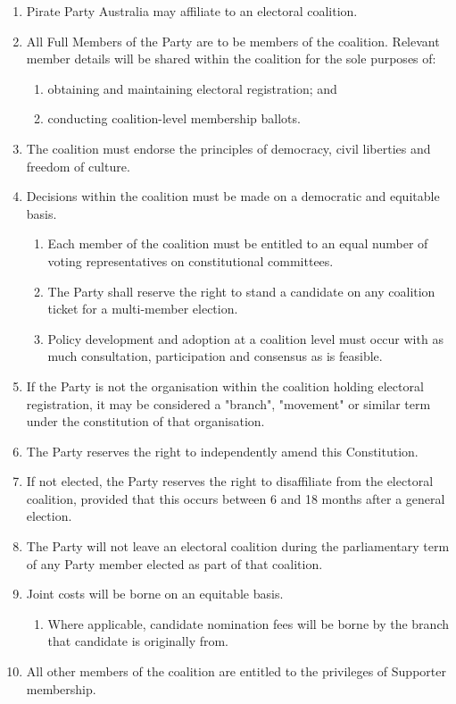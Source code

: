 \documentclass[a4paper,titlepage,8.5pt]{article}
\begin{document}
\begin{enumerate}
\item Pirate Party Australia may affiliate to an electoral coalition.
\item All Full Members of the Party are to be members of the coalition. Relevant member details will be shared within the coalition for the sole purposes of:
\begin{enumerate}
\item obtaining and maintaining electoral registration; and
\item conducting coalition-level membership ballots.
\end{enumerate}
\item The coalition must endorse the principles of democracy, civil liberties and freedom of culture.
\item Decisions within the coalition must be made on a democratic and equitable basis.
\begin{enumerate}
\item Each member of the coalition must be entitled to an equal number of voting representatives on constitutional committees.
\item The Party shall reserve the right to stand a candidate on any coalition ticket for a multi-member election.
\item Policy development and adoption at a coalition level must occur with as much consultation, participation and consensus as is feasible.
\end{enumerate}
\item If the Party is not the organisation within the coalition holding electoral registration, it may be considered a "branch", "movement" or similar term under the constitution of that organisation.
\item The Party reserves the right to independently amend this Constitution.
\item If not elected, the Party reserves the right to disaffiliate from the electoral coalition, provided that this occurs between 6 and 18 months after a general election.
\item The Party will not leave an electoral coalition during the parliamentary term of any Party member elected as part of that coalition.
\item Joint costs will be borne on an equitable basis.
\begin{enumerate}
\item Where applicable, candidate nomination fees will be borne by the branch that candidate is originally from.
\end{enumerate}
\item All other members of the coalition are entitled to the privileges of Supporter membership.
\end{enumerate}
\end{document}
